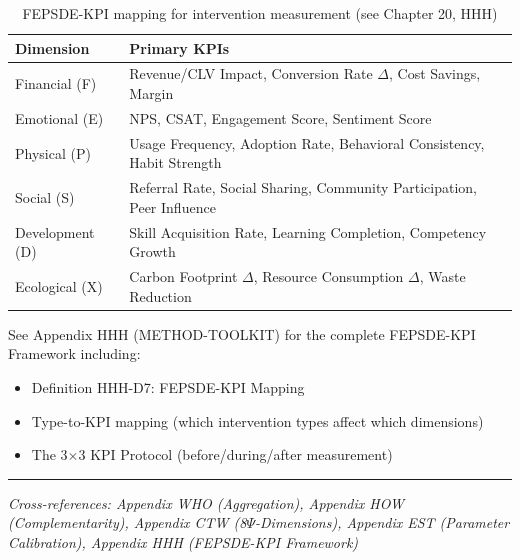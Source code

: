 \begin{table}[h]
\centering
\small
\begin{tabular}{l|p{6cm}}
\toprule
\textbf{Dimension} & \textbf{Primary KPIs} \\
\midrule
Financial (F) & Revenue/CLV Impact, Conversion Rate $\Delta$, Cost Savings, Margin \\
Emotional (E) & NPS, CSAT, Engagement Score, Sentiment Score \\
Physical (P) & Usage Frequency, Adoption Rate, Behavioral Consistency, Habit Strength \\
Social (S) & Referral Rate, Social Sharing, Community Participation, Peer Influence \\
Development (D) & Skill Acquisition Rate, Learning Completion, Competency Growth \\
Ecological (X) & Carbon Footprint $\Delta$, Resource Consumption $\Delta$, Waste Reduction \\
\bottomrule
\end{tabular}
\caption{FEPSDE-KPI mapping for intervention measurement (see Chapter 20, HHH)}
\end{table}

See Appendix HHH (METHOD-TOOLKIT) for the complete FEPSDE-KPI Framework including:
\begin{itemize}
    \item Definition HHH-D7: FEPSDE-KPI Mapping
    \item Type-to-KPI mapping (which intervention types affect which dimensions)
    \item The 3$\times$3 KPI Protocol (before/during/after measurement)
\end{itemize}

\vspace{0.5em}
\hrule
\vspace{0.5em}
\noindent\textit{Cross-references: Appendix WHO (Aggregation),
Appendix HOW (Complementarity), Appendix CTW (8$\Psi$-Dimensions),
Appendix EST (Parameter Calibration), Appendix HHH (FEPSDE-KPI Framework)}

